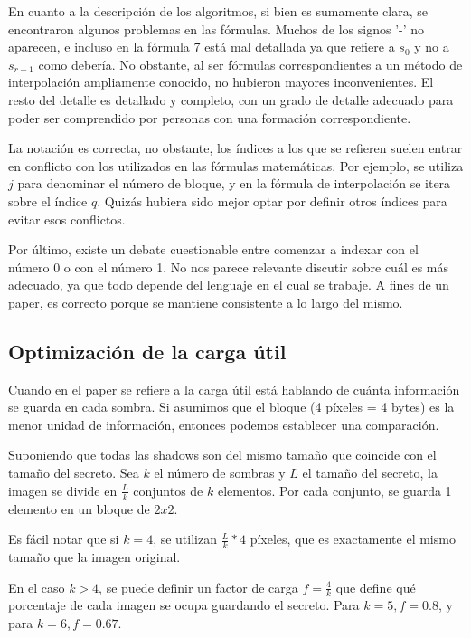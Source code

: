 \documentclass[11pt]{scrartcl} %
\begin{document}
En cuanto a la descripción de los algoritmos, si bien es sumamente clara, se encontraron algunos problemas en las fórmulas. Muchos de los signos '-' no aparecen, e incluso en la fórmula 7 está mal detallada ya que refiere a $s_{0}$ y no a $s_{r-1}$ como debería. No obstante, al ser fórmulas correspondientes a un método de interpolación ampliamente conocido, no hubieron mayores inconvenientes. El resto del detalle es detallado y completo, con un grado de detalle adecuado para poder ser comprendido por personas con una formación correspondiente.

La notación es correcta, no obstante, los índices a los que se refieren suelen entrar en conflicto con los utilizados en las fórmulas matemáticas. Por ejemplo, se utiliza $j$ para denominar el número de bloque, y en la fórmula de interpolación se itera sobre el índice $q$. Quizás hubiera sido mejor optar por definir otros índices para evitar esos conflictos.

Por último, existe un debate cuestionable entre comenzar a indexar con el número 0 o con el número 1. No nos parece relevante discutir sobre cuál es más adecuado, ya que todo depende del lenguaje en el cual se trabaje. A fines de un paper, es correcto porque se mantiene consistente a lo largo del mismo.


\subsection{Optimización de la carga útil}

Cuando en el paper se refiere a la carga útil está hablando de cuánta información se guarda en cada sombra. Si asumimos que el bloque (4 píxeles = 4 bytes) es la menor unidad de información, entonces podemos establecer una comparación.

Suponiendo que todas las shadows son del mismo tamaño que coincide con el tamaño del secreto. Sea $k$ el número de sombras y $L$ el tamaño del secreto, la imagen se divide en $\frac{L}{k}$ conjuntos de $k$ elementos. Por cada conjunto, se guarda 1 elemento en un bloque de $2x2$.

Es fácil notar que si $k = 4$, se utilizan $\frac{L}{k} * 4$ píxeles, que es exactamente el mismo tamaño que la imagen original.

En el caso $k > 4$, se puede definir un factor de carga $f = \frac{4}{k}$ que define qué porcentaje de cada imagen se ocupa guardando el secreto. Para $k = 5, f = 0.8$, y para $k = 6, f = 0.67$.
\end{document}
